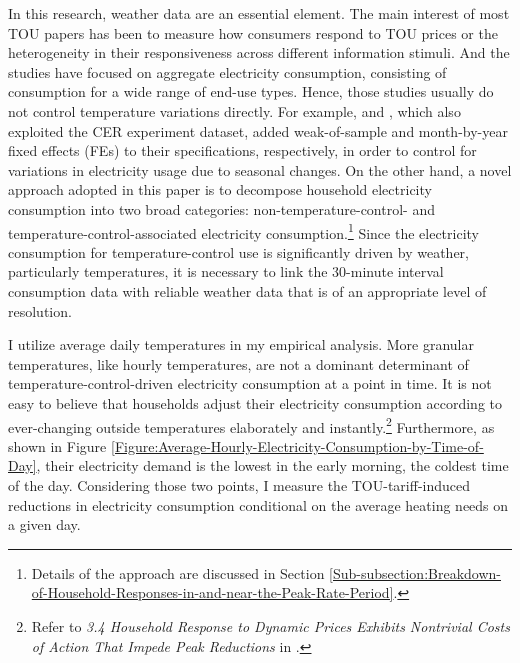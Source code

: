 In this research, weather data are an essential element. The main interest of most TOU papers has been to measure how consumers respond to TOU prices or the heterogeneity in their responsiveness across different information stimuli. And the studies have focused on aggregate electricity consumption, consisting of consumption for a wide range of end-use types. Hence, those studies usually do not control temperature variations directly. For example, \cite{The-Effect-of-Information-on-TOU-Electricity-Use:An-Irish-Residential-Study_Pon_2017} and \cite{Peaking-Interest:How-Awareness-Drives-the-Effectiveness-of-Time-of-Use-Electricity-Pricing_Prest_2020}, which also exploited the CER experiment dataset, added weak-of-sample and month-by-year fixed effects (FEs) to their specifications, respectively, in order to control for variations in electricity usage due to seasonal changes. On the other hand, a novel approach adopted in this paper is to decompose household electricity consumption into two broad categories: non-temperature-control- and temperature-control-associated electricity consumption.\footnote{Details of the approach are discussed in Section \ref{Sub-subsection:Breakdown-of-Household-Responses-in-and-near-the-Peak-Rate-Period}.} Since the electricity consumption for temperature-control use is significantly driven by weather, particularly temperatures, it is necessary to link the 30-minute interval consumption data with reliable weather data that is of an appropriate level of resolution. 

I utilize average daily temperatures in my empirical analysis. More granular temperatures, like hourly temperatures, are not a dominant determinant of temperature-control-driven electricity consumption at a point in time. It is not easy to believe that households adjust their electricity consumption according to ever-changing outside temperatures elaborately and instantly.\footnote{Refer to \textit{3.4 Household Response to Dynamic Prices Exhibits Nontrivial Costs of Action That Impede Peak Reductions} in \cite{Household-Responses-to-Time-Varying-Electricity-Prices_Harding-and-Sexton_2017}.} Furthermore, as shown in Figure \ref{Figure:Average-Hourly-Electricity-Consumption-by-Time-of-Day}, their electricity demand is the lowest in the early morning, the coldest time of the day. Considering those two points, I measure the TOU-tariff-induced reductions in electricity consumption conditional on the average heating needs on a given day. 

